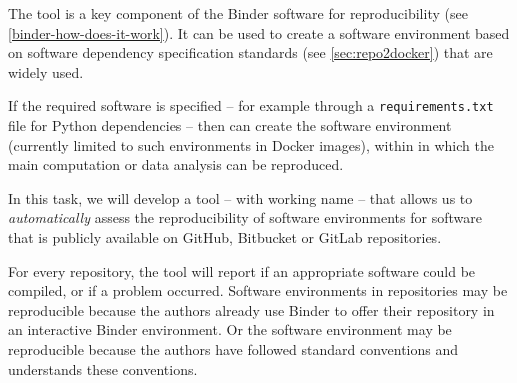 \begin{task}[
  title=Towards quantifiable progress for reproducible software environments,
  id=repo2docker-checker,
  lead=SRL,
  PM=10,
  wphases={0-24!0.42},
  partners={MP}
  ]
  The \repotodocker{} tool is a key component of the Binder software for
  reproducibility (see \ref{binder-how-does-it-work}). It can be used to create
  a software environment based on software dependency specification standards
  (see \ref{sec:repo2docker}) that are widely used.

  If the required software is specified -- for example through a
  \texttt{requirements.txt} file for Python dependencies -- then \repotodocker{}
  can create the software environment (currently limited to such environments in
  Docker images), within in which the main computation or data analysis can be
  reproduced.

  In this task, we will develop a tool -- with working name
   -- that allows us to \emph{automatically}
  assess the reproducibility of software environments for software that is
  publicly available on GitHub, Bitbucket or GitLab repositories.

  For every repository, the  tool will report if an
  appropriate software could be compiled, or if a problem occurred. Software
  environments in repositories may be reproducible because the authors already
  use Binder to offer their repository in an interactive Binder environment. Or
  the software environment may be reproducible because the authors have followed
  standard conventions
  and \repotodocker{} understands these conventions.


\end{task}
